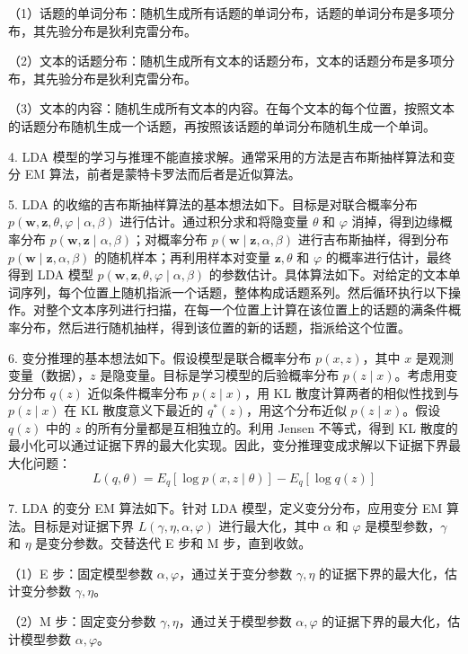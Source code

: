 \documentclass[UTF8,12pt,a4paper,fontset=fandol]{ctexart}
\begin{document}
（1）话题的单词分布：随机生成所有话题的单词分布，话题的单词分布是多项分布，其先验分布是狄利克雷分布。

（2）文本的话题分布：随机生成所有文本的话题分布，文本的话题分布是多项分布，其先验分布是狄利克雷分布。

（3）文本的内容：随机生成所有文本的内容。在每个文本的每个位置，按照文本的话题分布随机生成一个话题，再按照该话题的单词分布随机生成一个单词。

4. LDA 模型的学习与推理不能直接求解。通常采用的方法是吉布斯抽样算法和变分 EM 算法，前者是蒙特卡罗法而后者是近似算法。

5. LDA 的收缩的吉布斯抽样算法的基本想法如下。目标是对联合概率分布 $p(\mathbf{w},\mathbf{z},\theta,\varphi\mid\alpha,\beta)$ 进行估计。通过积分求和将隐变量 $\theta$ 和 $\varphi$ 消掉，得到边缘概率分布 $p(\mathbf{w},\mathbf{z}\mid\alpha,\beta)$；对概率分布 $p(\mathbf{w}\mid\mathbf{z},\alpha,\beta)$ 进行吉布斯抽样，得到分布 $p(\mathbf{w}\mid\mathbf{z},\alpha,\beta)$ 的随机样本；再利用样本对变量 $\mathbf{z},\theta$ 和 $\varphi$ 的概率进行估计，最终得到 LDA 模型 $p(\mathbf{w},\mathbf{z},\theta,\varphi\mid\alpha,\beta)$ 的参数估计。具体算法如下。对给定的文本单词序列，每个位置上随机指派一个话题，整体构成话题系列。然后循环执行以下操作。对整个文本序列进行扫描，在每一个位置上计算在该位置上的话题的满条件概率分布，然后进行随机抽样，得到该位置的新的话题，指派给这个位置。

6. 变分推理的基本想法如下。假设模型是联合概率分布 $p(x,z)$，其中 $x$ 是观测变量（数据），$z$ 是隐变量。目标是学习模型的后验概率分布 $p(z\mid x)$。考虑用变分分布 $q(z)$ 近似条件概率分布 $p(z\mid x)$，用 KL 散度计算两者的相似性找到与 $p(z\mid x)$ 在 KL 散度意义下最近的 $q^*(z)$，用这个分布近似 $p(z\mid x)$。假设 $q(z)$ 中的 $z$ 的所有分量都是互相独立的。利用 Jensen 不等式，得到 KL 散度的最小化可以通过证据下界的最大化实现。因此，变分推理变成求解以下证据下界最大化问题：
\[
L(q,\theta)=E_q[\log p(x,z\mid\theta)]-E_q[\log q(z)]
\]

7. LDA 的变分 EM 算法如下。针对 LDA 模型，定义变分分布，应用变分 EM 算法。目标是对证据下界 $L(\gamma,\eta,\alpha,\varphi)$ 进行最大化，其中 $\alpha$ 和 $\varphi$ 是模型参数，$\gamma$ 和 $\eta$ 是变分参数。交替迭代 E 步和 M 步，直到收敛。

（1）E 步：固定模型参数 $\alpha,\varphi$，通过关于变分参数 $\gamma,\eta$ 的证据下界的最大化，估计变分参数 $\gamma,\eta$。

（2）M 步：固定变分参数 $\gamma,\eta$，通过关于模型参数 $\alpha,\varphi$ 的证据下界的最大化，估计模型参数 $\alpha,\varphi$。
\end{document}
